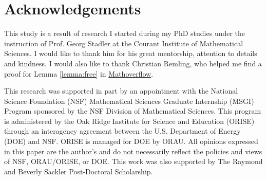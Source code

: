 \documentclass{siamonline220329}
\begin{document}
\section{Acknowledgements}
This study is a result of research I started during my PhD studies
under the instruction of Prof. Georg Stadler at the Courant Institute
of Mathematical Sciences. I would like to thank him for his great
mentorship, attention to details and kindness. I would also like to
thank Christian Remling, who helped me find a proof for Lemma
\ref{lemma:free} in
\href{https://mathoverflow.net/questions/280168/redistribute-diagonal-entries-of-a-matrix/280203#280203c}{Mathoverflow}.

This research was supported in part by an appointment with the
National Science Foundation (NSF) Mathematical Sciences Graduate
Internship (MSGI) Program sponsored by the NSF Division of
Mathematical Sciences. This program is administered by the Oak Ridge
Institute for Science and Education (ORISE) through an interagency
agreement between the U.S. Department of Energy (DOE) and NSF. ORISE
is managed for DOE by ORAU. All opinions expressed in this paper are
the author's and do not necessarily reflect the policies and views of
NSF, ORAU/ORISE, or DOE. This work was also supported by The Raymond
and Beverly Sackler Post-Doctoral Scholarship.



%


\end{document}

